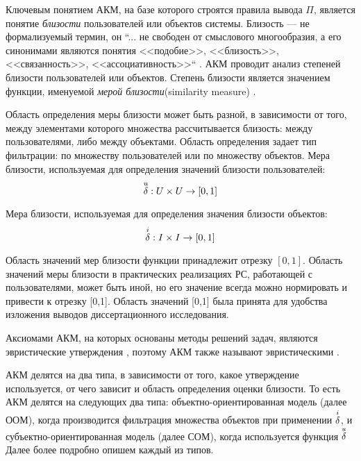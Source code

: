 Ключевым понятием АКМ, на базе которого строятся правила вывода $\Pi$,
является понятие {\it близости} пользователей или объектов системы.
Близость --- не формализуемый термин, он ``... не свободен от смыслового
многообразия, а его синонимами являются понятия <<подобие>>, <<близость>>,
<<связанность>>, <<ассоциативность>>`` \cite{fdca}. АКМ проводит анализ
степеней близости пользователей или объектов. Степень близости является значением
функции, именуемой
{\it мерой близости}(similarity measure)
 \cite{toward}.

Область определения меры близости может быть разной,
в зависимости от того, между элементами которого множества
рассчитывается близость: между пользователями, либо между объектами.
Область определения задает тип фильтрации: по множеству пользователей или по
множеству объектов.
Мера близости, используемая для определения значений близости пользователей:
\begin{equation}
	{\overset{u}{\mathcal{\delta}}} : U \times U \rightarrow [0,1]
\end{equation}

Мера близости, используемая для определения значения близости объектов:
\begin{equation}
	{\overset{i}{\mathcal{\delta}}} : I \times I \rightarrow [0,1]
\end{equation}

Область значений мер близости функции принадлежит отрезку $[0,1]$.
Область значений меры близости в практических реализациях РС, работающей с пользователями,
может быть иной, но его значение всегда можно нормировать \cite{norm}
и привести к отрезку [0,1]. Область значений [0,1] была принята для
удобства изложения выводов диссертационного исследования.

Аксиомами АКМ, на которых основаны методы решений задач, являются эвристические утверждения \cite{item-based,
topn2, person-rec-item-based, heur1, heur2, heur3},
поэтому	АКМ также
называют эвристическими \cite{heur3,heur1,heur2}.

АКМ делятся на два типа, в зависимости от того, какое утверждение
используется, от чего зависит и область определения оценки близости. То есть
АКМ делятся на следующих два типа: объектно-ориентированная модель (далее ООМ), когда
производится фильтрация множества объектов при применении ${\overset{i}{\mathcal{\delta}}}$, и
субъектно-ориентированная модель (далее СОМ), когда используется функция ${\overset{u}{\mathcal{\delta}}}$
Далее более подробно опишем каждый из типов.

